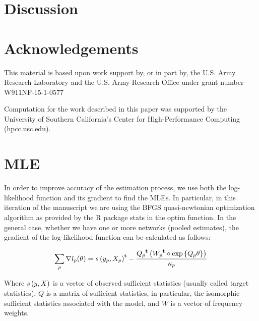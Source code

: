\documentclass[12pt]{article}
\begin{document}
\section{Discussion}

\section{Acknowledgements}

This material is based upon work support by, or in part by, the U.S. Army Research Laboratory and the U.S. Army Research Office under grant number W911NF-15-1-0577

Computation for the work described in this paper was supported by the University of Southern California’s Center for High-Performance Computing (hpcc.usc.edu).




\appendix

\section{MLE}

In order to improve accuracy of the estimation process, we use both the log-likelihood function and its gradient to find the MLEs. In particular, in this iteration of the manuscript we are using the BFGS quasi-newtonian optimization algorithm as provided by the R package stats in the optim function. In the general case, whether we have one or more networks (pooled estimates), the gradient of the log-likelihood function can be calculated as follows:

\begin{equation}
\sum_{p}\nabla l_p(\theta) = {s\left(y_p, X_p\right)}^\mathbf{t} - \frac{{Q_p}^\mathbf{t}\left({W_p}^\mathbf{t} \circ \mbox{exp}\left\{Q_p \theta\right\}\right)}{\kappa_p}
\end{equation}

Where $s\left(y, X\right)$ is a vector of observed sufficient statistics (usually called target statistics), $Q$ is a matrix of sufficient statistics, in particular, the isomorphic sufficient statistics associated with the model, and $W$ is a vector of frequency weights.
\end{document}
